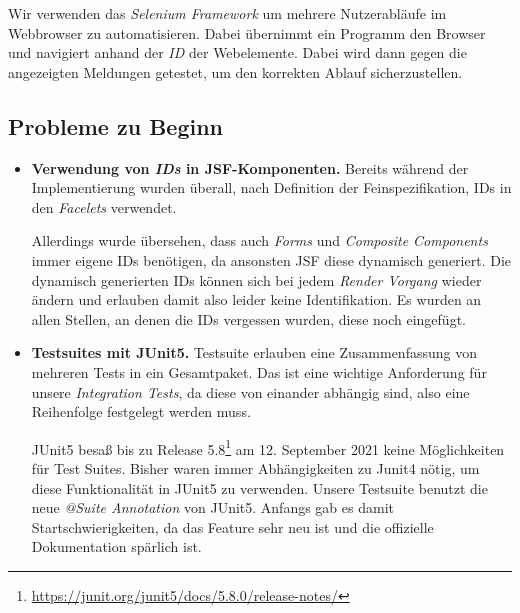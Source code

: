 
Wir verwenden das \emph{Selenium Framework} um mehrere Nutzerabläufe im Webbrowser zu automatisieren.
Dabei übernimmt ein Programm den Browser und navigiert anhand der \emph{ID}
der Webelemente. Dabei wird dann gegen die angezeigten Meldungen getestet, um
den korrekten Ablauf sicherzustellen.

\subsection{Probleme zu Beginn}

\begin{itemize}
	\item \textbf{Verwendung von \emph{IDs} in JSF-Komponenten.} Bereits während der
	Implementierung wurden überall, nach Definition der Feinspezifikation, IDs in den \emph{Facelets} verwendet.

	Allerdings wurde übersehen, dass auch \emph{Forms} und \emph{Composite Components} immer eigene IDs benötigen, da ansonsten JSF diese dynamisch
	generiert. Die dynamisch generierten IDs können sich bei jedem \emph{Render Vorgang} wieder ändern und erlauben damit also leider keine Identifikation.\newline
	Es wurden an allen Stellen, an denen die IDs vergessen wurden, diese noch eingefügt.

	\item \textbf{Testsuites mit JUnit5.} Testsuite erlauben eine Zusammenfassung von mehreren Tests in ein Gesamtpaket. Das ist eine wichtige
	Anforderung für unsere \emph{Integration Tests}, da diese von einander abhängig sind, also eine Reihenfolge festgelegt werden muss.

	JUnit5 besaß bis zu Release 5.8\footnote{\url{https://junit.org/junit5/docs/5.8.0/release-notes/}}
	am 12. September 2021 keine Möglichkeiten für Test Suites. Bisher waren immer Abhängigkeiten zu Junit4 nötig, um diese
	Funktionalität in JUnit5 zu verwenden. Unsere Testsuite benutzt die neue
	\emph{@Suite Annotation} von JUnit5. Anfangs gab es damit Startschwierigkeiten, da das Feature sehr neu ist und die offizielle
	Dokumentation spärlich ist.
\end{itemize}

